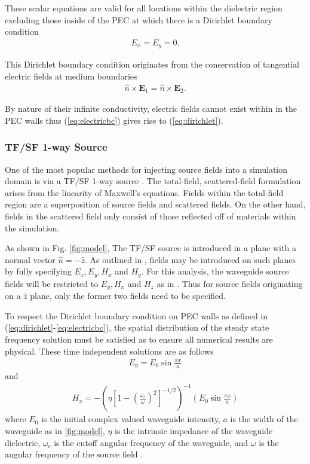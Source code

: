 These scalar equations are valid for all locations within the dielectric region excluding those inside of the PEC at which there is a Dirichlet boundary condition
\begin{align}
	E_x=E_y=0.
	\label{eq:dirichlet}
\end{align}

This Dirichlet boundary condition originates from the conservation of tangential electric fields at medium boundaries 
\begin{align}
	\hat{n}\times\textbf{E}_1=\hat{n}\times\textbf{E}_2.
	\label{eq:electricbc}
\end{align}

By nature of their infinite conductivity, electric fields cannot exist within in the PEC walls thus  (\ref{eq:electricbc}) gives rise to  (\ref{eq:dirichlet}).

\subsubsection{TF/SF 1-way Source}
\label{subsubsec:ftsf-mod}
One of the most popular methods for injecting source fields into a simulation domain is via a TF/SF 1-way source \cite{taftlovefdtd}. The total-field, scattered-field formulation arises from the linearity of Maxwell's equations. Fields within the total-field region are a superposition of source fields and scattered fields. On the other hand, fields in the scattered field only consist of those reflected off of materials within the simulation.

As shown in Fig. \ref{fig:model}, The TF/SF source is introduced in a plane with a normal vector $\hat{n}=-\hat{z}$. As outlined in \cite{taftlovefdtd}, fields may be introduced on such planes by fully specifying $E_x, E_y, H_x$ and $H_y$. For this analysis, the waveguide source fields will be restricted to $E_y, H_x$ and $H_z$ as in \cite{fieldsandwavescomm}. Thus for source fields originating on a $\hat{z}$ plane, only the former two fields need to be specified. 

To respect the Dirichlet boundary condition on PEC walls as defined in   (\ref{eq:dirichlet}-\ref{eq:electricbc}), the spatial distribution of the steady state frequency solution must be satisfied as to ensure all numerical results are physical. These time independent solutions are as follows
\begin{align}
	E_y=E_0\sin{\frac{\pi x}{a}}
	\label{eq:eyfreq}
\end{align}
and
\begin{align}
	H_x = -\left(\eta\left[1-\left(\frac{\omega_c}{\omega}\right)^2\right]^{-1/2}\right)^{-1}\left(E_0\sin{\frac{\pi x}{a}}\right)
	\label{eq:hxfreq}
\end{align}
where $E_0$ is the initial complex valued waveguide intensity, $a$ is the width of the waveguide as in \ref{fig:model}, $\eta$ is the intrinsic impedance of the waveguide dielectric, $\omega_c$ is the cutoff angular frequency of the waveguide, and $\omega$ is the angular frequency of the source field \cite{fieldsandwavescomm}.

